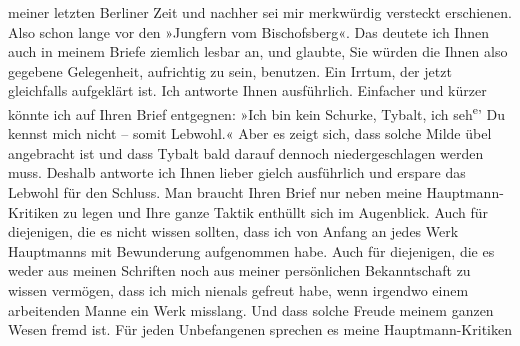\begin{ledgroupsized}[t]{13cm}
               meiner letzten Berliner Zeit und nachher sei mir
               merkwürdig versteckt erschienen. Also schon lange vor den »Jungfern vom Bischofsberg«. Das deutete ich Ihnen auch in
               meinem Briefe ziemlich lesbar an, und glaubte, Sie würden die Ihnen also gegebene
               Gelegenheit, aufrichtig zu sein, benutzen. Ein Irrtum, der jetzt gleichfalls
               aufgeklärt ist.\pend
           \pstart
           Ich antworte Ihnen ausführlich. Einfacher und kürzer {\pb}könnte ich auf Ihren Brief
               entgegnen: »Ich bin kein Schurke,
                  Tybalt, ich seh\substVorne{}\textsuperscript{e}\substDazwischen{}’\substHinten{} Du kennst mich nicht – somit Lebwohl.« Aber es zeigt sich, dass
               solche Milde übel angebracht ist und dass Tybalt bald darauf dennoch niedergeschlagen
               werden muss. Deshalb antworte ich Ihnen lieber gielch ausführlich und erspare das
               Lebwohl für den Schluss.\pend
           \pstart
           Man braucht Ihren Brief nur neben meine Hauptmann-Kritiken zu
               legen und Ihre ganze Taktik enthüllt sich im Augenblick. Auch für diejenigen, die es
               nicht wissen sollten, dass ich von Anfang an jedes Werk Hauptmanns mit Bewunderung aufgenommen habe. Auch für
               diejenigen, die es weder aus meinen Schriften noch aus meiner persönlichen
               Bekanntschaft zu wissen vermögen, dass ich mich nienals gefreut habe, wenn irgendwo
               einem arbeitenden Manne ein Werk misslang. Und dass solche Freude meinem ganzen Wesen
               fremd ist.\pend
           \pstart
           Für jeden Unbefangenen sprechen es meine Hauptmann-Kritiken

\end{ledgroupsized}
